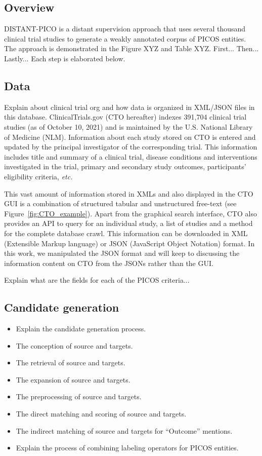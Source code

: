\documentclass[10.7pt,]{article}
\begin{document}
\subsection{Overview}\label{overview}
%
DISTANT-PICO is a distant supervision approach that uses several thousand clinical trial studies to generate a weakly annotated corpus of PICOS entities.
The approach is demonstrated in the Figure XYZ and Table XYZ.
First...
Then...
Lastly...
Each step is elaborated below.
%
%
%
\subsection{Data}\label{data}
%
Explain about clinical trial org and how data is organized in XML/JSON files in this database.
ClinicalTrials.gov (CTO hereafter) indexes 391,704 clinical trial studies (as of October 10, 2021) and is maintained by the U.S. National Library of Medicine (NLM).
Information about each study stored on CTO is entered and updated by the principal investigator of the corresponding trial.
This information includes title and summary of a clinical trial, disease conditions and interventions investigated in the trial, primary and secondary study outcomes, participants' eligibility criteria, \textit{etc.}

This vast amount of information stored in XMLs and also displayed in the CTO GUI is a combination of structured tabular and unstructured free-text (see Figure~\ref{fig:CTO_example}).
Apart from the graphical search interface, CTO also provides an API to query for an individual study, a list of studies and a method for the complete database crawl.
This information can be downloaded in XML (Extensible Markup language) or JSON (JavaScript Object Notation) format.
In this work, we manipulated the JSON format and will keep to discussing the information content on CTO from the JSONs rather than the GUI.

Explain what are the fields for each of the PICOS criteria...
%
%
%
\subsection{Candidate generation}\label{candgen}

\begin{itemize}
    \item Explain the candidate generation process.
    \item The conception of source and targets.
    \item The retrieval of source and targets.
    \item The expansion of source and targets.
    \item The preprocessing of source and targets.
    \item The direct matching and scoring of source and targets.
    \item The indirect matching of source and targets for ``Outcome'' mentions.
    \item Explain the process of combining labeling operators for PICOS entities.
\end{itemize}
%
%
%
\end{document}
